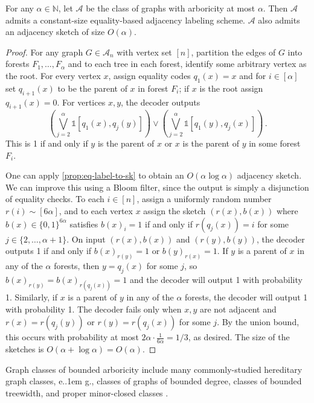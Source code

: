 \documentclass{theoretics}
\makeatletter
\newcommand{\ind}[1]{\mathds{1} \left[ #1 \right] }
\newcommand{\zo}{\{0,1\}}
\newcommand{\cA}{\ensuremath{\mathcal{A}}}
\newcommand{\bN}{\ensuremath{\mathbb{N}}}
\newcommand*\eg{e.\kern.1em g.\@\xspace} %
\makeatother
\begin{document}
\begin{lemma}
\label{lemma:arboricity}
For any $\alpha \in \bN$, let $\cA$ be the class of graphs with arboricity at most $\alpha$. Then
$\cA$ admits a constant-size equality-based adjacency labeling scheme. $\cA$ also admits an
adjacency sketch of size $O(\alpha)$.
\end{lemma}
\begin{proof}
For any graph $G \in \cA_n$ with vertex set $[n]$, partition the edges of $G$ into forests $F_1,
\dotsc, F_\alpha$ and to each tree in each forest, identify some arbitrary vertex as the root. For
every vertex $x$, assign equality codes $q_1(x) = x$ and for $i \in [\alpha]$ set $q_{i+1}(x)$ to be
the parent of $x$ in forest $F_i$; if $x$ is the root assign $q_{i+1}(x) = 0$.  For vertices $x,y$,
the decoder outputs
\[
  \left(\bigvee_{j = 2}^\alpha \ind{ q_1(x), q_j(y) } \right) \vee
  \left(\bigvee_{j = 2}^\alpha \ind{ q_1(y), q_j(x) } \right) \,.
\]
This is 1 if and only if $y$ is the parent of $x$ or $x$ is the parent of $y$ in some forest $F_i$.

One can apply \cref{prop:eq-label-to-sk} to obtain an $O(\alpha \log \alpha)$ adjacency sketch. We can
improve this using a Bloom filter, since the output is simply a disjunction of equality checks. To
each $i \in [n]$, assign a uniformly random number $r(i) \sim [6\alpha]$, and to each vertex $x$
assign the sketch $(r(x), b(x))$ where $b(x) \in \zo^{6\alpha}$ satisfies $b(x)_i = 1$ if and
only if $r(q_j(x)) = i$ for some $j \in \{2, \dotsc, \alpha+1\}$. On input $(r(x), b(x))$ and
$(r(y), b(y))$, the decoder outputs 1 if and only if $b(x)_{r(y)} = 1$ or $b(y)_{r(x)} = 1$. If $y$
is a parent of $x$ in any of the $\alpha$ forests, then $y=q_j(x)$ for some $j$, so $b(x)_{r(y)} =
b(x)_{r(q_j(x))} = 1$ and the decoder will output 1 with probability 1. Similarly, if $x$ is a
parent of $y$ in any of the $\alpha$ forests, the decoder will output 1 with probability 1. The
decoder fails only when $x,y$ are not adjacent and $r(x) = r(q_j(y))$ or $r(y) = r(q_j(x))$ for some
$j$. By the union bound, this occurs with probability at most $2\alpha \cdot \frac{1}{6\alpha} =
1/3$, as desired. The size of the sketches is $O(\alpha + \log \alpha) = O(\alpha)$.
\end{proof}

\begin{remark}
\label{remark:treewidth}
Graph classes of bounded arboricity include many commonly-studied hereditary graph classes, \eg, classes of graphs of bounded degree, classes of bounded treewidth, and proper minor-closed classes \cite{Mad67}.
\end{remark}
\end{document}
